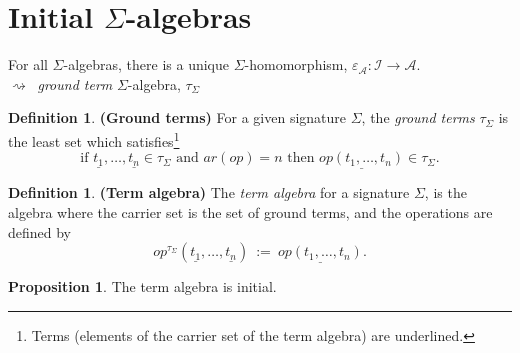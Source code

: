 \documentclass{amsart}
\theoremstyle{definition}
\newtheorem{definition}[thm]{Definition}
\newtheorem{proposition}[thm]{Proposition}
\newcommand{\ca}{\mathcal A} %
\begin{document}
\section{Initial $\Sigma$-algebras}
\begin{minipage}[b]{0.4\linewidth}
\begin{center}
\end{center}
\end{minipage}
\begin{minipage}[b]{0.5\linewidth}
For all $\Sigma$-algebras, there is a unique $\Sigma$-homomorphism, $\varepsilon_\ca : \mathcal I \to \ca$.\\
$\rightsquigarrow~$ \textit{ground term} $\Sigma$-algebra, $\tau_\Sigma$\\
\end{minipage}

\begin{definition}\textbf{(Ground terms)} For a given signature $\Sigma$, the \textit{ground terms} $\tau_\Sigma$ is the least set which satisfies\footnote{Terms (elements of the carrier set of the term algebra) are underlined.}
$$\text{if } \underline{t_1}, \dots, \underline{t_n} \in \tau_\Sigma \text{ and }ar(op) = n \text{ then } \underline{op(t_1, \dots, t_n)} \in \tau_\Sigma.$$
\end{definition}

\begin{definition}\textbf{(Term algebra)} The \textit{term algebra} for a signature $\Sigma$, is the algebra where the carrier set is the set of ground terms, and the operations are defined by
$$op^{\tau_\Sigma}(\underline{t_1}, \dots , \underline{t_n}) ~:=~ \underline{op(t_1, \dots, t_n)}.$$
\end{definition}



\begin{proposition}The term algebra is initial.
\end{proposition}
\end{document}
